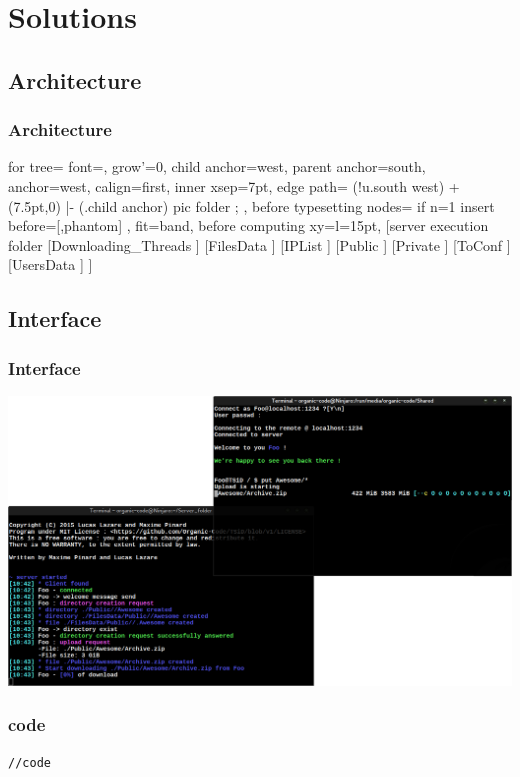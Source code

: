 \documentclass[11pt]{beamer}
\begin{document}
\section{Solutions}
	\subsection{Architecture}

		\begin{frame}
			\frametitle{Architecture}
			\begin{forest}
			  for tree={
			    font=\ttfamily,
			    grow'=0,
			    child anchor=west,
			    parent anchor=south,
			    anchor=west,
			    calign=first,
			    inner xsep=7pt,
			    edge path={
			      \noexpand{}
			      (!u.south west) +(7.5pt,0) |- (.child anchor) pic {folder} ;
			    },
			    before typesetting nodes={
			      if n=1
			        {insert before={[,phantom]}}
			        {}
			    },
			    fit=band,
			    before computing xy={l=15pt},
			  }  
			[server execution folder
			  [Downloading\_Threads
			  ]
			  [FilesData
			  ]
			  [IPList
			  ]
			  [Public
			  ]
			  [Private
			  ]
			  [ToConf
			  ]
			  [UsersData
			  ]
			]
			\end{forest}
		\end{frame}

	\subsection{Interface}

		\begin{frame}
			\frametitle{Interface}
			\includegraphics[width=\linewidth]{interface}
		\end{frame}
\begin{frame}[fragile]
\frametitle{code}
\begin{lstlisting}
//code
\end{lstlisting}
\end{frame}
\end{document}

